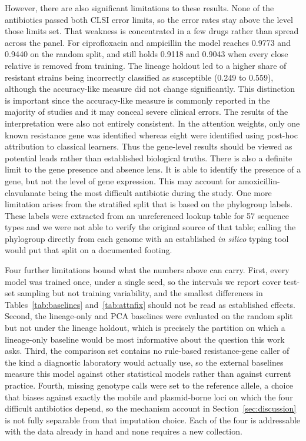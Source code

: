 \documentclass[journal]{IEEEtran}
\begin{document}
However, there are also significant limitations to these results. None of the
antibiotics passed both CLSI error limits, so the error rates stay above the level
those limits set. That weakness is concentrated in a few drugs rather than spread
across the panel. For ciprofloxacin and ampicillin the model reaches 0.9773 and 0.9440
on the random split, and still holds 0.9118 and 0.9043 when every close relative is
removed from training. The lineage holdout led to a higher share of resistant strains
being incorrectly classified as susceptible (0.249 to 0.559), although the
accuracy-like measure did not change significantly. This distinction is important
since the accuracy-like measure is commonly reported in the majority of studies and it
may conceal severe clinical errors. The results of the interpretation were also not
entirely consistent. In the attention weights, only one known resistance gene was
identified whereas eight were identified using post-hoc attribution to classical
learners. Thus the gene-level results should be viewed as potential leads rather than
established biological truths. There is also a definite limit to the gene presence and
absence lens. It is able to identify the presence of a gene, but not the level of gene
expression. This may account for amoxicillin-clavulanate being the most difficult
antibiotic during the study. One more limitation arises from the stratified split that
is based on the phylogroup labels. These labels were extracted from an unreferenced
lookup table for 57 sequence types and we were not able to verify the original source
of that table; calling the phylogroup directly from each genome with an established
\textit{in silico} typing tool \cite{beghain2018clermontyping} would put that split on
a documented footing.

Four further limitations bound what the numbers above can carry. First, every model
was trained once, under a single seed, so the intervals we report cover test-set
sampling but not training variability, and the smallest differences in
Tables~\ref{tab:baselines} and~\ref{tab:attnfix} should not be read as established
effects. Second, the lineage-only and PCA baselines were evaluated on the random split
but not under the lineage holdout, which is precisely the partition on which a
lineage-only baseline would be most informative about the question this work asks.
Third, the comparison set contains no rule-based resistance-gene caller of the kind a
diagnostic laboratory would actually use, so the external baselines measure this model
against other statistical models rather than against current practice. Fourth,
missing genotype calls were set to the reference allele, a choice that biases against
exactly the mobile and plasmid-borne loci on which the four difficult antibiotics
depend, so the mechanism account in Section~\ref{sec:discussion} is not fully separable
from that imputation choice. Each of the four is addressable with the data already in
hand and none requires a new collection.
\end{document}
